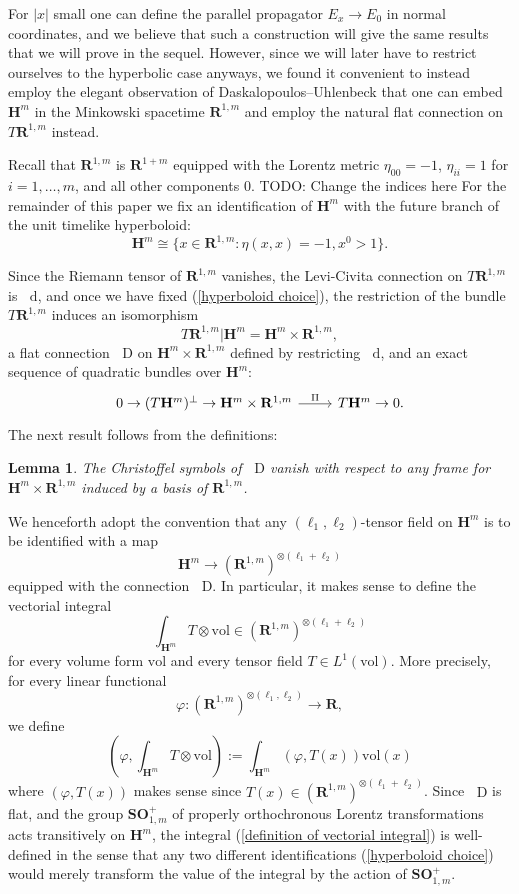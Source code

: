 \documentclass[reqno,12pt,letterpaper]{amsart}
\newcommand{\RR}{\mathbf{R}}
\newcommand{\Hyp}{\mathbf H}
\newcommand{\SpOrth}{\mathbf{SO}}
\newcommand*\dif{\mathop{}\!\mathrm{d}}
\newcommand*\Dif{\mathop{}\!\mathrm{D}}
\newcommand{\vol}{\mathrm{vol}}
\newtheorem{lemma}[theorem]{Lemma}
\theoremstyle{definition}
\numberwithin{equation}{section}
\begin{document}
For $|x|$ small one can define the parallel propagator $E_x \to E_0$ in normal coordinates, and we believe that such a construction will give the same results that we will prove in the sequel.
However, since we will later have to restrict ourselves to the hyperbolic case anyways, we found it convenient to instead employ the elegant observation of Daskalopoulos--Uhlenbeck \cite{daskalopoulosPrep1} that one can embed $\Hyp^m$ in the Minkowski spacetime $\RR^{1, m}$ and employ the natural flat connection on $T\RR^{1, m}$ instead.

Recall that $\RR^{1,m}$ is $\RR^{1 + m}$ equipped with the Lorentz metric $\eta_{00} = -1$, $\eta_{ii} = 1$ for $i = 1, \dots, m$, and all other components $0$. TODO: Change the indices here
For the remainder of this paper we fix an identification of $\Hyp^m$ with the future branch of the unit timelike hyperboloid:
\begin{equation}\label{hyperboloid choice}
\Hyp^m \cong \{x \in \RR^{1,m}: \eta(x, x) = -1, x^0 > 1\}.
\end{equation}

Since the Riemann tensor of $\RR^{1,m}$ vanishes, the Levi-Civita connection on $T\RR^{1, m}$ is $\dif$, and once we have fixed (\ref{hyperboloid choice}), the restriction of the bundle $T\RR^{1, m}$ induces an isomorphism
$$T\RR^{1,m}|\Hyp^m = \Hyp^m \times \RR^{1,m},$$
a flat connection $\Dif$ on $\Hyp^m \times \RR^{1, m}$ defined by restricting $\dif$, and an exact sequence of quadratic bundles over $\Hyp^m$:
$$\begin{tikzcd}
0 \to (T\Hyp^m)^\perp \to \Hyp^m \times \RR^{1, m} \arrow[r,"\Pi"] & T\Hyp^m \to 0.
\end{tikzcd}$$
The next result follows from the definitions:

\begin{lemma}
The Christoffel symbols of $\Dif$ vanish with respect to any frame for $\Hyp^m \times \RR^{1,m}$ induced by a basis of $\RR^{1, m}$.
\end{lemma}

We henceforth adopt the convention that any $(\ell_1, \ell_2)$-tensor field on $\Hyp^m$ is to be identified with a map
$$\Hyp^m \to (\RR^{1, m})^{\otimes(\ell_1 + \ell_2)}$$
equipped with the connection $\Dif$.
In particular, it makes sense to define the vectorial integral
\begin{equation}\label{definition of vectorial integral}
\int_{\Hyp^m} T \otimes \vol \in (\RR^{1, m})^{\otimes (\ell_1 + \ell_2)}
\end{equation}
for every volume form $\vol$ and every tensor field $T \in L^1(\vol)$. More precisely, for every linear functional
$$\varphi: (\RR^{1, m})^{\otimes(\ell_1, \ell_2)} \to \RR,$$
we define 
$$\left(\varphi, \int_{\Hyp^m} T \otimes \vol\right) := \int_{\Hyp^m} (\varphi, T(x)) \vol(x)$$
where $(\varphi, T(x))$ makes sense since $T(x) \in (\RR^{1, m})^{\otimes (\ell_1 + \ell_2)}$.
Since $\Dif$ is flat, and the group $\SpOrth^+_{1, m}$ of properly orthochronous Lorentz transformations acts transitively on $\Hyp^m$, the integral (\ref{definition of vectorial integral}) is well-defined in the sense that any two different identifications (\ref{hyperboloid choice}) would merely transform the value of the integral by the action of $\SpOrth^+_{1, m}$.
\end{document}
